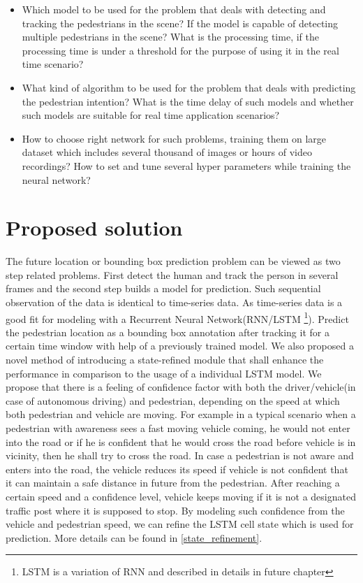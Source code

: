 \begin{itemize}
	\item Which model to be used for the problem that deals with detecting and tracking the pedestrians in the scene? If the model is capable of detecting multiple pedestrians in the scene? What is the processing time, if the processing time is under a threshold for the purpose of using it in the real time scenario?

	\item 
What kind of algorithm to be used for the problem that deals with predicting the pedestrian intention? What is the time delay of such models and whether such models are suitable for real time application scenarios?

	\item How to choose right network for such problems, training them on large dataset which includes several thousand of images or hours of video recordings? How to set and tune several hyper parameters while training the neural network? 

\end{itemize}

\section{Proposed solution}
The future location or bounding box prediction problem can be viewed as two step related problems. First detect the human and track the person in several frames and the second step builds a model for prediction. Such sequential observation of the data is identical to time-series data. As time-series data is a good fit for modeling with a Recurrent Neural Network(RNN/LSTM \footnote{LSTM is a variation of RNN and described in details in future chapter}). Predict the pedestrian location as a bounding box annotation after tracking it for a certain time window with help of a previously trained model. 
\newpara
We also proposed a novel method of introducing a state-refined module that shall enhance the performance in comparison to the usage of a individual LSTM model. 
We propose that there is a feeling of confidence factor with both the driver/vehicle(in case of autonomous driving) and pedestrian, depending on the speed at which both pedestrian and vehicle are moving. For example in a typical scenario when a pedestrian with awareness sees a fast moving vehicle coming, he would not enter into the road or if he is confident that he would cross the road before vehicle is in vicinity, then he shall try to cross the road. In case a pedestrian is not aware and enters into the road, the vehicle reduces its speed if vehicle is not confident that it can maintain a safe distance in future from the pedestrian. After reaching a certain speed and a confidence level, vehicle keeps moving if it is not a designated traffic post where it is supposed to stop. By modeling such confidence from the vehicle and pedestrian speed, we can refine the LSTM cell state which is used for prediction. More details can be found in \ref{state_refinement}.


